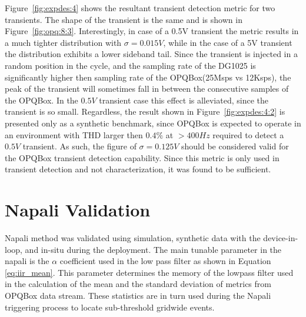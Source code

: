Figure~\ref{fig:expdes:4} shows the resultant transient detection metric for two transients.
The shape of the transient is the same and is shown in Figure~\ref{fig:opq:8:3}.
Interestingly, in case of a 0.5V transient the metric results in a much tighter distribution with $\sigma =0.015V$, while in the case of
a 5V transient the distribution exhibits a lower sideband tail.
Since the transient is injected in a random position in the cycle, and the sampling rate of the DG1025 is significantly higher then sampling rate of the OPQBox(25Msps vs 12Ksps), the peak of the transient will sometimes fall in between the consecutive samples of the OPQBox.
In the $0.5V$ transient case this effect is alleviated, since the transient is so small.
Regardless, the result shown in Figure~\ref{fig:expdes:4:2} is presented only as a synthetic benchmark, since OPQBox is expected to operate in an environment with THD larger then $0.4\%$ at $>400Hz$ required to detect a $0.5V$ transient.
As such, the figure of $\sigma=0.125V$ should be considered valid for the OPQBox transient detection capability.
Since this metric is only used in transient detection and not characterization, it was found to be sufficient.

\section{Napali Validation}\label{sec:napali-validation.}
Napali method was validated using simulation, synthetic data with the device-in-loop, and in-situ during the deployment.
The main tunable parameter in the napali is the $\alpha$ coefficient used in the low pass filter as shown in Equation \ref{eq:iir_mean}.
This parameter determines the memory of the lowpass filter used in the calculation of the mean and the standard deviation of metrics from OPQBox data stream.
These statistics are in turn used during the Napali triggering process to locate sub-threshold gridwide events.

